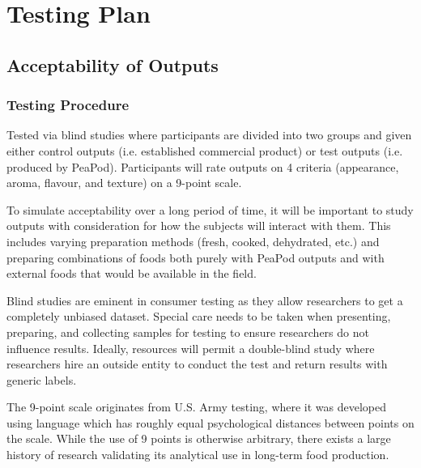 \section{Testing Plan}

\subsection{Acceptability of Outputs}

\subsubsection{Testing Procedure}
Tested via blind studies where participants are divided into two groups and given either control outputs (i.e. established commercial product) or test outputs (i.e. produced by PeaPod). Participants will rate outputs on 4 criteria (appearance, aroma, flavour, and texture) on a 9-point scale.

To simulate acceptability over a long period of time, it will be important to study outputs with consideration for how the subjects will interact with them. This includes varying preparation methods (fresh, cooked, dehydrated, etc.) and preparing combinations of foods both purely with PeaPod outputs and with external foods that would be available in the field.

Blind studies are eminent in consumer testing as they allow researchers to get a completely unbiased dataset. Special care needs to be taken when presenting, preparing, and collecting samples for testing to ensure researchers do not influence results. Ideally, resources will permit a double-blind study where researchers hire an outside entity to conduct the test and return results with generic labels.

The 9-point scale originates from U.S. Army testing, where it was developed using language which has roughly equal psychological distances between points on the scale. While the use of 9 points is otherwise arbitrary, there exists a large history of research validating its analytical use in long-term food production.

